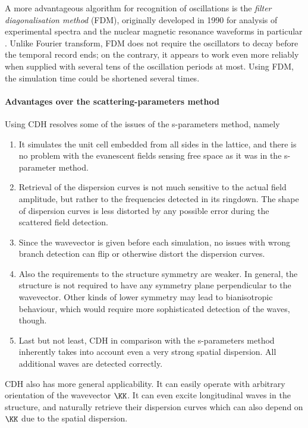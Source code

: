 A more advantageous algorithm for recognition of oscillations is the \textit{filter diagonalisation method} (FDM), originally  developed in 1990 for analysis of experimental spectra and the nuclear magnetic resonance waveforms in particular \cite{mandelshtam1997harmonic, chao2002comparative}. Unlike Fourier transform, FDM does not require the oscillators to decay before the temporal record ends; on the contrary, it appears to work even more reliably when supplied with several tens of the oscillation periods at most. Using FDM, the simulation time could be shortened several times.

\paragraph{Advantages over the scattering-parameters method}%
Using CDH resolves some of the issues of the s-parameters method, namely 
\label{cdhadvantages}
\begin{enumerate}
\item{It simulates the unit cell embedded from all sides in the lattice, and there is no problem with the evanescent fields sensing free space as it was in the s-parameter method.} 
\item{Retrieval of the dispersion curves is not much sensitive to the actual field amplitude, but rather to the frequencies detected in its ringdown. The shape of dispersion curves is less distorted by any possible error during the scattered field detection.} 
\item{Since the wavevector is given before each simulation, no issues with wrong branch detection can flip or otherwise distort the dispersion curves.} 
\item{Also the requirements to the structure symmetry are weaker. In general, the structure is not required to have any symmetry plane perpendicular to the wavevector. Other kinds of lower symmetry may lead to bianisotropic behaviour, which would require more sophisticated detection of the waves, though.}
\item{Last but not least, CDH in comparison with the s-parameters method inherently takes into account even a very strong spatial dispersion. All additional waves are detected correctly.}
\end{enumerate}

CDH also has more general applicability. It can easily operate with arbitrary orientation of the wavevector $\KK$. It can even excite longitudinal waves in the structure, and naturally retrieve their dispersion curves which can also depend on $\KK$ due to the spatial dispersion. 

